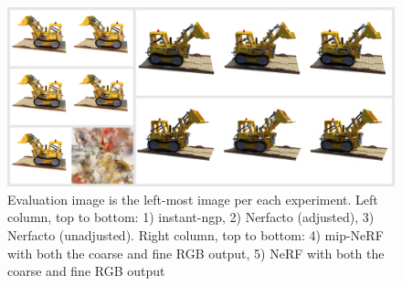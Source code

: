 \begin{figure}[h]
    \centering
    \includegraphics[width=1.0\textwidth]{figures/lego-result.png}
    \caption{Evaluation image is the left-most image per each experiment.
    Left column, top to bottom: 1) instant-ngp, 2) Nerfacto (adjusted), 3) Nerfacto (unadjusted). Right column, top to bottom: 4) mip-NeRF with both the coarse and fine RGB output, 5) NeRF with both the coarse and fine RGB output}
    \label{fig:lego-result}
\end{figure}